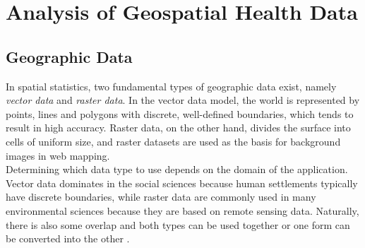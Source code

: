%

\chapter{Analysis of Geospatial Health Data}
\label{sec:geodata}
\clearpage
\section{Geographic Data}
In spatial statistics, two fundamental types of geographic data exist, namely \textit{vector data} and \textit{raster data}. In the vector data model, the world is represented by points, lines and polygons with discrete, well-defined boundaries, which tends to result in high accuracy. Raster data, on the other hand, divides the surface into cells of uniform size, and raster datasets are used as the basis for background images in web mapping. \\
Determining which data type to use depends on the domain of the application. Vector data dominates in the social sciences because human settlements typically have discrete boundaries, while raster data are commonly used in many environmental sciences because they are based on remote sensing data. Naturally, there is also some overlap and both types can be used together or one form can be converted into the other \autocite[][]{lovelace2019geocomputation}.
